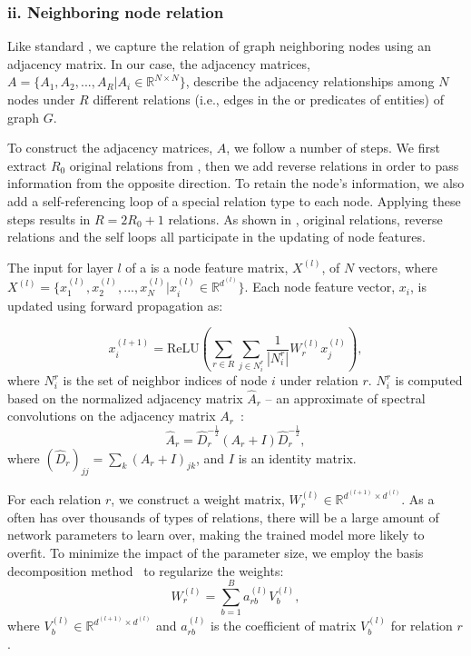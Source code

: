  \subsubsection{ii. Neighboring node relation}
 Like standard \RGCNs, we capture the relation of graph neighboring nodes using an adjacency matrix.
 In our case, the adjacency matrices, $A=\{A_1,A_2,...,A_R |A_i \in \mathbb{R}^{N
 \times N} \}$, describe the adjacency relationships among $N$ nodes under $R$ different relations (i.e., edges in the \KG or predicates of entities) of graph $G$.

 To construct the adjacency matrices, $A$, we follow a number of steps. We first extract $R_0$ original
 relations from \KGs, then we add reverse relations in order to pass information from the opposite direction. To retain the node's
 information, we also add a self-referencing loop of a special relation type to each node. Applying these steps results in $R=2R_0+1$ relations. As shown in
 , original relations, reverse relations and the self loops all participate in the updating of node features.

 The input for layer $l$ of a \RGCN is a node feature matrix, $X^{(l)}$, of $N$ vectors, where  $X^{(l)} =\{x^{(l)}_1,x^{(l)}_2,...,x^{(l)}_{N}
 |x^{(l)}_{i} \in \mathbb{R}^{d^{(l)}}\}$. Each node feature vector, $x_i$, is updated using forward propagation as:

	\begin{equation}
	x_i^{(l+1)}=\mathrm{ReLU} (\sum\limits_{r \in R}\sum\limits_{j \in N_i^r}\frac{1}{|N_i^r|}W_r^{(l)}x_j^{(l)}),
	\end{equation} where $N_i^r$ is the set of neighbor indices of node $i$ under relation $r$.
    $N_i^r$ is computed based on the normalized adjacency
matrix $\hat A_r$ -- an approximate of spectral convolutions on the adjacency matrix $A_r$~\cite{Kipf2016Semi}:
	\begin{equation}
	\hat A_r=\hat D_r^{- \frac{1}{2}}(A_r+I)\hat D_r^{- \frac{1}{2}},
	\end{equation}
	where $(\hat D_r)_{jj}=\sum_k(A_r+I)_{jk}$, and $I$ is an identity matrix.

	
	 For each relation $r$, we construct a weight matrix, $W_r^{(l)} \in \mathbb{R}^{d^{(l+1)}
\times d^{(l)}}$. As a \KG often has over thousands of types of relations, there will be a large amount of network parameters to learn
over, making the trained model more likely to overfit. To minimize the impact of the parameter size, we employ the basis decomposition
method~\cite{Schlichtkrull2017Modeling} to regularize the weights:
	\begin{equation}
	W_r^{(l)}=\sum\limits_{b=1}^B a_{rb}^{(l)}V_b^{(l)},
	\end{equation}
	where $V_b^{(l)} \in \mathbb{R}^{d^{(l+1)} \times d^{(l)}}$ and $a_{rb}^{(l)}$ is the coefficient of matrix $V_b^{(l)}$ for relation $r$.
	
